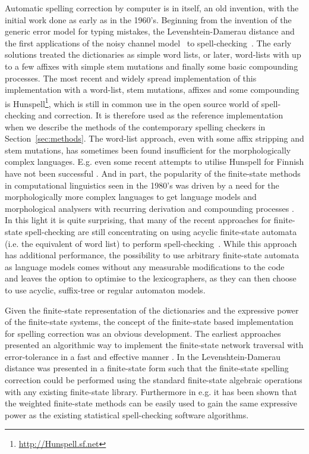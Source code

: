 \documentclass[a4paper,12pt]{article}
\begin{document}
Automatic spelling correction by computer is in itself, an old invention, with
the initial work done as early as in the 1960's. Beginning from the invention
of the generic error model for typing mistakes, the Levenshtein-Damerau
distance \cite[]{levenshtein/1966,damerau/1964} and the first applications of
the noisy channel model~\cite[]{shannon/1948} to
spell-checking~\cite[]{raviv/1967}.  The early solutions treated the
dictionaries as simple word lists, or later, word-lists with up to a few
affixes with simple stem mutations and finally some basic compounding
processes. The most recent and widely spread implementation of this
implementation with a word-list, stem mutations, affixes and some compounding
is Hunspell\footnote{\url{http://Hunspell.sf.net}}, which is still in common
use in the open source world of spell-checking and correction.  It is therefore
used as the reference implementation when we describe the methods of the
contemporary spelling checkers in Section~\ref{sec:methods}. The word-list
approach, even with some affix stripping and stem mutations, has sometimes been
found insufficient for the morphologically complex languages.  E.g. even some
recent attempts to utilise Hunspell for Finnish have not been successful
\cite[]{pitkanen/2006}. And in part, the popularity of the finite-state methods
in computational linguistics seen in the 1980's was driven by a need for the
morphologically more complex languages to get language models and morphological
analysers with recurring derivation and compounding processes
\cite[]{beesley2004morphological}.  In this light it is quite surprising, that
many of the recent approaches for finite-state spell-checking are still
concentrating on using acyclic finite-state automata (i.e. the equivalent of
word list) to perform
spell-checking~\cite[]{watson2003new,deorowicz2005correcting}. While this
approach has additional performance, the possibility to use arbitrary
finite-state automata as language models comes without any measurable
modifications to the code~\cite[e.g.][]{pirinen/2010/lrec} and leaves the
option to optimise to the lexicographers, as they can then choose to use
acyclic, suffix-tree or regular automaton models.

Given the  finite-state representation of the dictionaries and the expressive
power of the finite-state systems, the concept of the finite-state based
implementation for spelling correction was an obvious development. The
earliest approaches presented an algorithmic way to implement the finite-state
network traversal with error-tolerance \cite[]{oflazer/1996} in a fast and
effective manner \cite[]{agata/2002,hulden/2009}.  In \cite{schulz/2002} the
Levenshtein-Damerau distance was presented in a finite-state form such that the
finite-state spelling correction could be performed using the standard
finite-state algebraic operations with any existing finite-state library.
Furthermore in e.g.  \cite{pirinen/2010/lrec} it has been shown that the
weighted finite-state methods can be easily used to gain the same expressive
power as the existing statistical spell-checking software algorithms.
\end{document}
